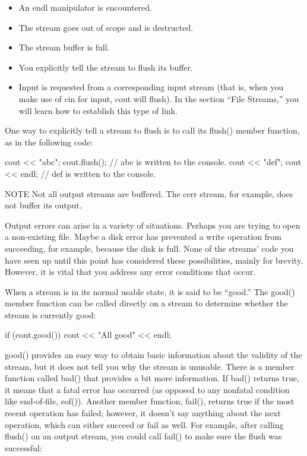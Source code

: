 \begin{itemize}
\item
An endl manipulator is encountered.

\item
The stream goes out of scope and is destructed.

\item
The stream buffer is full.

\item
You explicitly tell the stream to flush its buffer.

\item
Input is requested from a corresponding input stream (that is, when you make use of cin for input, cout will flush). In the section “File Streams,” you will learn how to establish this type of link.
\end{itemize}

One way to explicitly tell a stream to flush is to call its flush() member function, as in the following code:

\begin{cpp}
cout << "abc";
cout.flush(); // abc is written to the console.
cout << "def";
cout << endl; // def is written to the console.
\end{cpp}

\begin{myNotic}{NOTE}
Not all output streams are buffered. The cerr stream, for example, does not buffer its output.
\end{myNotic}


Output errors can arise in a variety of situations. Perhaps you are trying to open a non-existing file. Maybe a disk error has prevented a write operation from succeeding, for example, because the disk is full. None of the streams’ code you have seen up until this point has considered these possibilities, mainly for brevity. However, it is vital that you address any error conditions that occur.

When a stream is in its normal usable state, it is said to be “good.” The good() member function can be called directly on a stream to determine whether the stream is currently good:

\begin{cpp}
if (cout.good()) {
    cout << "All good" << endl;
}
\end{cpp}

good() provides an easy way to obtain basic information about the validity of the stream, but it does not tell you why the stream is unusable. There is a member function called bad() that provides a bit more information. If bad() returns true, it means that a fatal error has occurred (as opposed to any nonfatal condition like end-of-file, eof()). Another member function, fail(), returns true if the most recent operation has failed; however, it doesn’t say anything about the next operation, which can either succeed or fail as well. For example, after calling flush() on an output stream, you could call fail() to make sure the flush was successful:

